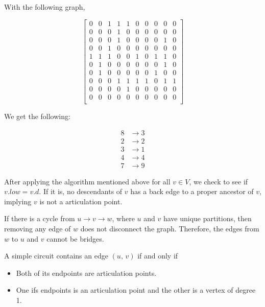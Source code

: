 \documentclass[12pt]{scrartcl}
\begin{document}
With the following graph,

\begin{equation*}
    \begin{bmatrix}
        0 & 0 & 1 & 1 & 1 & 0 & 0 & 0 & 0 & 0 \\
        0 & 0 & 0 & 1 & 0 & 0 & 0 & 0 & 0 & 0 \\
        0 & 0 & 0 & 1 & 0 & 0 & 0 & 0 & 1 & 0 \\
        0 & 0 & 1 & 0 & 0 & 0 & 0 & 0 & 0 & 0 \\
        1 & 1 & 1 & 0 & 0 & 1 & 0 & 1 & 1 & 0 \\
        0 & 1 & 0 & 0 & 0 & 0 & 0 & 0 & 1 & 0 \\
        0 & 1 & 0 & 0 & 0 & 0 & 0 & 1 & 0 & 0 \\
        0 & 0 & 0 & 1 & 1 & 1 & 1 & 0 & 1 & 1 \\
        0 & 0 & 0 & 0 & 1 & 0 & 0 & 0 & 0 & 0 \\
        0 & 0 & 0 & 0 & 0 & 0 & 0 & 0 & 0 & 0 \\
    \end{bmatrix}
\end{equation*}

We get the following:

\begin{align*}
    8 &\rightarrow 3 \\
    2 &\rightarrow 2 \\
    3 &\rightarrow 1 \\
    4 &\rightarrow 4 \\
    7 &\rightarrow 9
\end{align*}

\subproblem{} %
After applying the algorithm mentioned above for all $v \in V$, we check to see if $v.low = v.d$. If it is, no descendants of $v$ has a back edge to a proper ancestor of $v$, implying $v$ is not a articulation point.

\subproblem{} %
If there is a cycle from $u \rightarrow v \rightarrow w$, where $u$ and $v$ have unique partitions, then removing any edge of $w$ does not disconnect the graph. Therefore, the edges from $w$ to $u$ and $v$ cannot be bridges.

\subproblem{} %
A simple circuit contains an edge $(u,\, v)$ if and only if

\begin{itemize}
    \item Both of its endpoints are articulation points.
    \item One ifs endpoints is an articulation point and the other is a vertex of degree 1.
\end{itemize}
\end{document}
